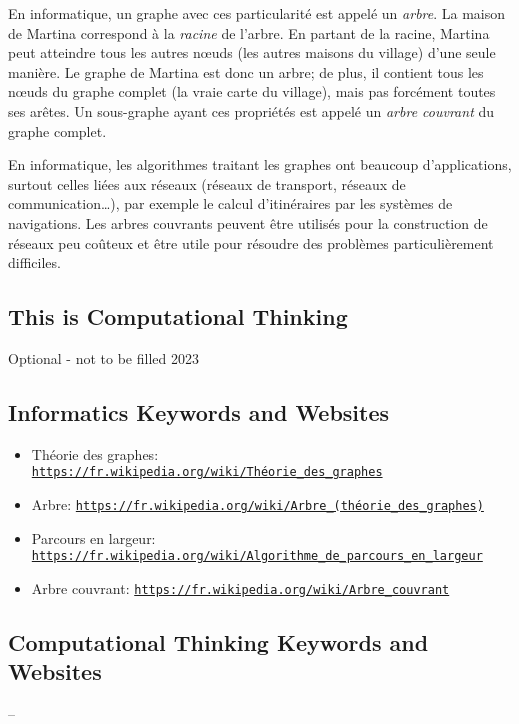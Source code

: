 \documentclass[a4paper,11pt]{report}
\newcommand{\BrochureUrlText}[1]{\texttt{#1}}
\begin{document}
En informatique, un graphe avec ces particularité est appelé un \emph{arbre}. La maison de Martina correspond à la \emph{racine} de l’arbre. En partant de la racine, Martina peut atteindre tous les autres nœuds (les autres maisons du village) d’une seule manière. Le graphe de Martina est donc un arbre; de plus, il contient tous les nœuds du graphe complet (la vraie carte du village), mais pas forcément toutes ses arêtes. Un sous-graphe ayant ces propriétés est appelé un \emph{arbre couvrant} du graphe complet.

En informatique, les algorithmes traitant les graphes ont beaucoup d’applications, surtout celles liées aux réseaux (réseaux de transport, réseaux de communication…), par exemple le calcul d’itinéraires par les systèmes de navigations. Les arbres couvrants peuvent être utilisés pour la construction de réseaux peu coûteux et être utile pour résoudre des problèmes particulièrement difficiles.


\subsection*{This is Computational Thinking}

Optional - not to be filled 2023


\subsection*{Informatics Keywords and Websites}

\begin{itemize}
  \item Théorie des graphes: \href{https://fr.wikipedia.org/wiki/Th\%C3\%A9orie_des_graphes}{\BrochureUrlText{https://fr.wikipedia.org/wiki/Théorie\_des\_graphes}}
  \item Arbre: \href{https://fr.wikipedia.org/wiki/Arbre_(th\%C3\%A9orie_des_graphes)}{\BrochureUrlText{https://fr.wikipedia.org/wiki/Arbre\_(théorie\_des\_graphes)}}
  \item Parcours en largeur: \href{https://fr.wikipedia.org/wiki/Algorithme_de_parcours_en_largeur}{\BrochureUrlText{https://fr.wikipedia.org/wiki/Algorithme\_de\_parcours\_en\_largeur}}
  \item Arbre couvrant: \href{https://fr.wikipedia.org/wiki/Arbre_couvrant}{\BrochureUrlText{https://fr.wikipedia.org/wiki/Arbre\_couvrant}}
\end{itemize}


\subsection*{Computational Thinking Keywords and Websites}

–
\end{document}
